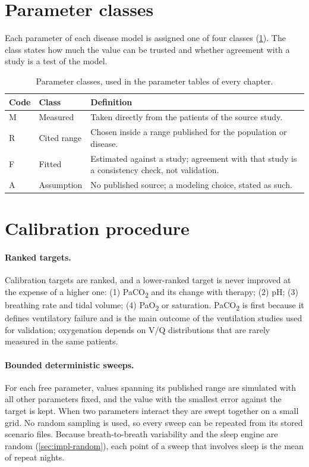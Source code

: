 \section{Parameter classes}
\label{sec:par-class}
Each parameter of each disease model is assigned one of four classes (\cref{tab:par-class}). The class states how much the value can be trusted and whether agreement with a study is a test of the model.

\begin{table}[ht]
\centering
\caption{Parameter classes, used in the parameter tables of every chapter.}
\label{tab:par-class}
\small
\begin{tabularx}{\linewidth}{@{}l l X@{}}
\toprule
Code & Class & Definition \\
\midrule
M & Measured & Taken directly from the patients of the source study. \\
R & Cited range & Chosen inside a range published for the population or disease. \\
F & Fitted & Estimated against a study; agreement with that study is a consistency check, not validation. \\
A & Assumption & No published source; a modeling choice, stated as such. \\
\bottomrule
\end{tabularx}
\end{table}

\section{Calibration procedure}
\label{sec:par-calib}
\paragraph{Ranked targets.} Calibration targets are ranked, and a lower-ranked target is never improved at the expense of a higher one: (1) PaCO\textsubscript{2} and its change with therapy; (2) pH; (3) breathing rate and tidal volume; (4) PaO\textsubscript{2} or saturation. PaCO\textsubscript{2} is first because it defines ventilatory failure and is the main outcome of the ventilation studies used for validation; oxygenation depends on V/Q distributions that are rarely measured in the same patients.

\paragraph{Bounded deterministic sweeps.} For each free parameter, values spanning its published range are simulated with all other parameters fixed, and the value with the smallest error against the target is kept. When two parameters interact they are swept together on a small grid. No random sampling is used, so every sweep can be repeated from its stored scenario files. Because breath-to-breath variability and the sleep engine are random (\cref{sec:impl-random}), each point of a sweep that involves sleep is the mean of repeat nights.

